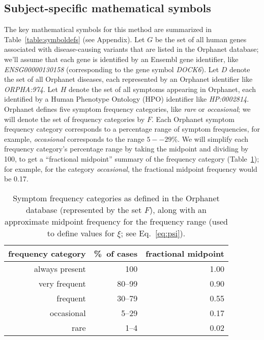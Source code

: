 \documentclass[11pt,notitlepage,english]{article}
\begin{document}
\subsection{Subject-specific mathematical symbols}
 The key mathematical symbols for this method are summarized in
 Table~\ref{table:symboldefs} (see Appendix).  Let $G$ be the set of all human
 genes associated with disease-causing variants that are listed in the Orphanet
 database; we'll assume that each gene is identified by an Ensembl gene
 identifier, like {\em ENSG00000130158\/} (corresponding to the gene symbol {\em
   DOCK6\/}). Let $D$ denote the set of all Orphanet diseases, each represented
 by an Orphanet identifier like {\em ORPHA:974}.  Let $H$ denote the set of all
 symptoms appearing in Orphanet, each identified by a Human Phenotype Ontology
 (HPO) identifier like {\em HP:0002814}. Orphanet defines five symptom frequency
 categories, like {\em rare\/} or {\em occasional\/}; we will denote the set of
 frequency categories by $F$. Each Orphanet symptom frequency category
 corresponds to a percentage range of symptom frequencies, for example, {\em
   occasional\/} corresponds to the range $5--29$\%. We will simplify each
 frequency category's percentage range by taking the midpoint and dividing by
 100, to get a ``fractional midpoint'' summary of the frequency category
 (Table~\ref{table:freq}); for example, for the category {\em occasional}, the
 fractional midpoint frequency would be 0.17.
\begin{table}[!htb]
  \begin{center}
    \begin{tabular}{rrr} \toprule
      frequency category & \hspace{0.5cm}\%~of cases & \hspace{0.5cm}fractional midpoint \\\midrule\midrule
      always present & 100 & 1.00 \\\midrule
      very frequent & 80--99 & 0.90 \\\midrule
      frequent & 30--79 & 0.55 \\\midrule
      occasional & 5--29 & 0.17 \\\midrule
      rare & 1--4 & 0.02 \\\bottomrule
    \end{tabular}
    \caption{Symptom frequency categories as defined in the Orphanet database
      (represented by the set $F$), along with
      an approximate midpoint frequency for the frequency range (used to define
      values for $\xi$; see Eq.~\ref{eq:psi}).}\label{table:freq}
  \end{center}
\end{table}
\end{document}
